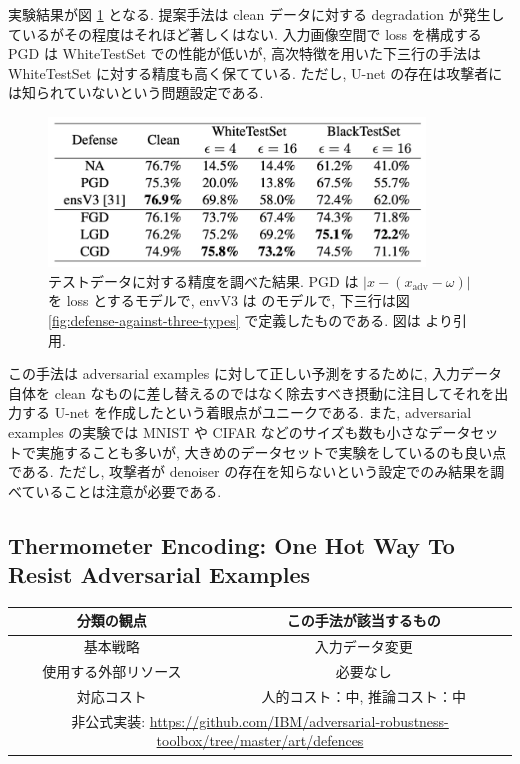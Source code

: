 実験結果が図 \ref{fig:defense-against-result-table} となる.
提案手法は clean データに対する degradation が発生しているがその程度はそれほど著しくはない.
入力画像空間で loss を構成する PGD は WhiteTestSet での性能が低いが, 高次特徴を用いた下三行の手法は WhiteTestSet に対する精度も高く保てている.
ただし, U-net の存在は攻撃者には知られていないという問題設定である.
%
\begin{figure}[htbp]
\begin{center}
\includegraphics[width=10.0cm]{figures/defense-against-result-table.pdf}
\end{center}
\caption{
テストデータに対する精度を調べた結果.
PGD は $|x - (x_{\text{adv}} - \omega)|$ を loss とするモデルで, envV3 は \cite{tramer2017ensemble} のモデルで, 下三行は図 \ref{fig:defense-against-three-types} で定義したものである.
図は \cite{liao2018defense} より引用.
}
\label{fig:defense-against-result-table}
\end{figure}
%

この手法は adversarial examples に対して正しい予測をするために, 入力データ自体を clean なものに差し替えるのではなく除去すべき摂動に注目してそれを出力する U-net を作成したという着眼点がユニークである.
また, adversarial examples の実験では MNIST や CIFAR などのサイズも数も小さなデータセットで実施することも多いが, 大きめのデータセットで実験をしているのも良い点である.
ただし, 攻撃者が denoiser の存在を知らないという設定でのみ結果を調べていることは注意が必要である.



\subsection{Thermometer Encoding: One Hot Way To Resist Adversarial Examples}
\label{subsec:thermometer-encoding}
%
\begin{table}[htbp]
\begin{center}
\begin{tabular}{|c|c|}
\hline
分類の観点 & この手法が該当するもの \\
\hline
基本戦略 & 入力データ変更 \\
使用する外部リソース & 必要なし \\
対応コスト & 人的コスト：中, 推論コスト：中 \\
\hline
\multicolumn{2}{|c|}{非公式実装: \href{https://github.com/IBM/adversarial-robustness-toolbox/tree/master/art/defences}{https://github.com/IBM/adversarial-robustness-toolbox/tree/master/art/defences}} \\
\hline
\end{tabular}
\label{tb:thermometer_encoding_summary}
\end{center}
\end{table}
%

